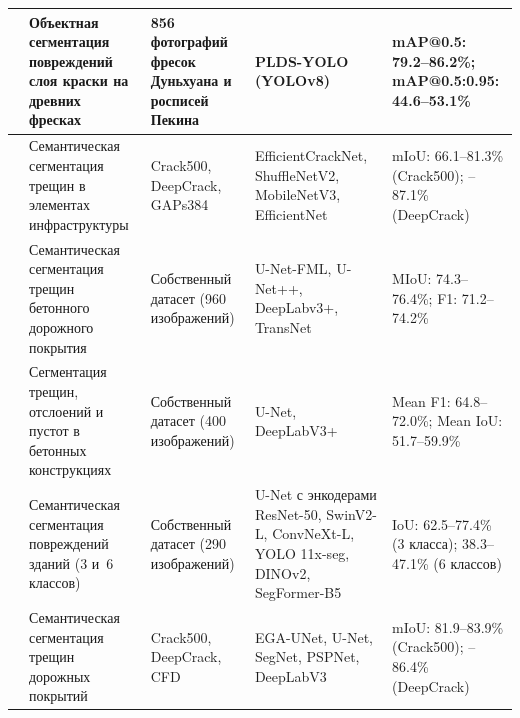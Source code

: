 \documentclass[14pt]{extarticle}
\begin{document}
{\begin{longtable}{|p{1.8cm}|p{4cm}|p{3.5cm}|p{3cm}|p{3cm}|}
    \cite{chen2025murals} &
    Объектная сегментация повреждений слоя краски на древних фресках &
    856 фотографий фресок Дуньхуана и росписей Пекина &
    PLDS-YOLO (YOLOv8) &
    mAP@0.5: 79.2--86.2\%; mAP@0.5:0.95: 44.6--53.1\% \\
    \hline

    \cite{zim2024efficientcracknet} &
    Семантическая сегментация трещин в элементах инфраструктуры &
    Crack500, DeepCrack, GAPs384 &
    EfficientCrackNet, \newline ShuffleNetV2, MobileNetV3, EfficientNet&
    mIoU: 66.1--81.3\% (Crack500); \newline 78.2--87.1\% (DeepCrack) \\
    \hline

    \cite{zhang2025pavement} &
    Семантическая сегментация трещин бетонного дорожного покрытия &
    Собственный датасет (960 изображений) &
    U-Net-FML, U-Net++, DeepLabv3+, TransNet &
    MIoU: 74.3--76.4\%; \newline F1: 71.2--74.2\%  \\
    \hline

    \cite{hadinata2023multiclass} &
    Сегментация трещин, отслоений и пустот в бетонных конструкциях &
    Собственный датасет (400 изображений) &
    U-Net, DeepLabV3+ &
    Mean F1: 64.8--72.0\%; Mean IoU: 51.7--59.9\% \\
    \hline

    \cite{lysanets2025} &
    Семантическая сегментация повреждений зданий (3 и~6 классов) &
    Собственный датасет (290 изображений) &
    U-Net с энкодерами ResNet-50, SwinV2-L, ConvNeXt-L, YOLO 11x-seg, DINOv2, SegFormer-B5 &
    IoU: 62.5--77.4\% (3 класса); 38.3--47.1\% (6 классов) \\
    \hline

    \cite{yang2025egaunet} &
    Семантическая сегментация трещин дорожных покрытий &
    Crack500, DeepCrack, CFD &
    EGA-UNet, \newline U-Net, SegNet, \newline PSPNet, DeepLabV3 &
    mIoU: 81.9--83.9\% (Crack500); \newline 84.2--86.4\% (DeepCrack) \\

\end{longtable}
}

\end{document}
